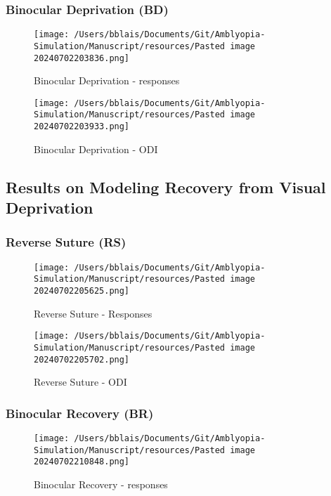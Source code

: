 \documentclass[
]{article}
\begin{document}
\subsubsection{Binocular Deprivation
(BD)}\label{sec:binocular-deprivation-bd}

\begin{figure}
\centering
\texttt{[image: /Users/bblais/Documents/Git/Amblyopia-Simulation/Manuscript/resources/Pasted image 20240702203836.png]}
\caption{Binocular Deprivation -
responses}\label{fig:Pasted_image_20240702203836.png}
\end{figure}

\begin{figure}
\centering
\texttt{[image: /Users/bblais/Documents/Git/Amblyopia-Simulation/Manuscript/resources/Pasted image 20240702203933.png]}
\caption{Binocular Deprivation -
ODI}\label{fig:Pasted_image_20240702203933.png}
\end{figure}

\subsection{Results on Modeling Recovery from Visual
Deprivation}\label{sec:results-on-modeling-recovery-from-visual-deprivation}

\subsubsection{Reverse Suture (RS)}\label{sec:reverse-suture-rs}

\begin{figure}
\centering
\texttt{[image: /Users/bblais/Documents/Git/Amblyopia-Simulation/Manuscript/resources/Pasted image 20240702205625.png]}
\caption{Reverse Suture -
Responses}\label{fig:Pasted_image_20240702205625.png}
\end{figure}

\begin{figure}
\centering
\texttt{[image: /Users/bblais/Documents/Git/Amblyopia-Simulation/Manuscript/resources/Pasted image 20240702205702.png]}
\caption{Reverse Suture -
ODI}\label{fig:Pasted_image_20240702205702.png}
\end{figure}

\subsubsection{Binocular Recovery (BR)}\label{sec:binocular-recovery-br}

\begin{figure}
\centering
\texttt{[image: /Users/bblais/Documents/Git/Amblyopia-Simulation/Manuscript/resources/Pasted image 20240702210848.png]}
\caption{Binocular Recovery -
responses}\label{fig:Pasted_image_20240702210848.png}
\end{figure}
\end{document}
